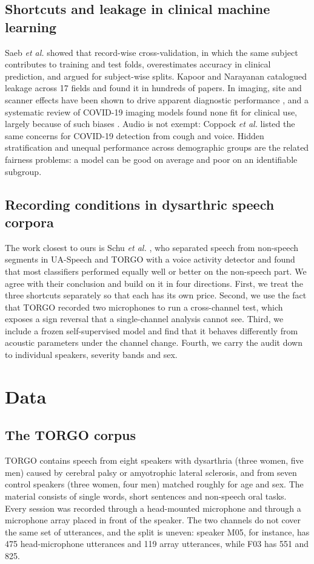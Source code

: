 \documentclass[conference]{IEEEtran}
\begin{document}
\subsection{Shortcuts and leakage in clinical machine learning}
Saeb \emph{et al.} \cite{saeb2017} showed that record-wise cross-validation, in which the same subject contributes to training and test folds, overestimates accuracy in clinical prediction, and argued for subject-wise splits. Kapoor and Narayanan \cite{kapoor2023} catalogued leakage across 17 fields and found it in hundreds of papers. In imaging, site and scanner effects have been shown to drive apparent diagnostic performance \cite{zech2018,degrave2021}, and a systematic review of COVID-19 imaging models found none fit for clinical use, largely because of such biases \cite{roberts2021}. Audio is not exempt: Coppock \emph{et al.} \cite{coppock2021} listed the same concerns for COVID-19 detection from cough and voice. Hidden stratification \cite{oakden2020} and unequal performance across demographic groups \cite{obermeyer2019} are the related fairness problems: a model can be good on average and poor on an identifiable subgroup.

\subsection{Recording conditions in dysarthric speech corpora}
The work closest to ours is Schu \emph{et al.} \cite{schu2023}, who separated speech from non-speech segments in UA-Speech and TORGO with a voice activity detector and found that most classifiers performed equally well or better on the non-speech part. We agree with their conclusion and build on it in four directions. First, we treat the three shortcuts separately so that each has its own price. Second, we use the fact that TORGO recorded two microphones to run a cross-channel test, which exposes a sign reversal that a single-channel analysis cannot see. Third, we include a frozen self-supervised model and find that it behaves differently from acoustic parameters under the channel change. Fourth, we carry the audit down to individual speakers, severity bands and sex.

\section{Data}
\subsection{The TORGO corpus}
TORGO \cite{rudzicz2012} contains speech from eight speakers with dysarthria (three women, five men) caused by cerebral palsy or amyotrophic lateral sclerosis, and from seven control speakers (three women, four men) matched roughly for age and sex. The material consists of single words, short sentences and non-speech oral tasks. Every session was recorded through a head-mounted microphone and through a microphone array placed in front of the speaker. The two channels do not cover the same set of utterances, and the split is uneven: speaker M05, for instance, has 475 head-microphone utterances and 119 array utterances, while F03 has 551 and 825.
\end{document}
